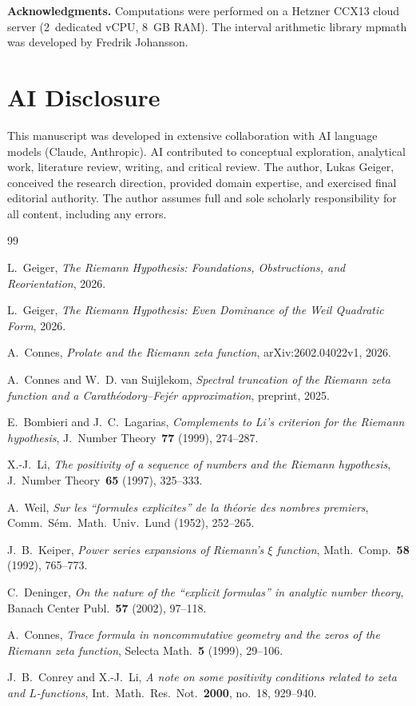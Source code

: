 \documentclass[12pt,a4paper]{article}
\theoremstyle{definition}
\theoremstyle{remark}
\begin{document}
\bigskip
\noindent\textbf{Acknowledgments.} Computations were performed on a Hetzner CCX13 cloud server (2~dedicated vCPU, 8~GB RAM). The interval arithmetic library mpmath was developed by Fredrik Johansson.


\section*{AI Disclosure}

This manuscript was developed in extensive collaboration with AI language models (Claude, Anthropic). AI contributed to conceptual exploration, analytical work, literature review, writing, and critical review. The author, Lukas Geiger, conceived the research direction, provided domain expertise, and exercised final editorial authority. The author assumes full and sole scholarly responsibility for all content, including any errors.


\begin{thebibliography}{99}

L.~Geiger, \emph{The Riemann Hypothesis: Foundations, Obstructions, and Reorientation}, 2026.

L.~Geiger, \emph{The Riemann Hypothesis: Even Dominance of the Weil Quadratic Form}, 2026.

A.~Connes, \emph{Prolate and the Riemann zeta function}, arXiv:2602.04022v1, 2026.

A.~Connes and W.~D. van Suijlekom, \emph{Spectral truncation of the Riemann zeta function and a Carath\'eodory--Fej\'er approximation}, preprint, 2025.

E.~Bombieri and J.~C.~Lagarias, \emph{Complements to Li's criterion for the Riemann hypothesis}, J.~Number Theory~\textbf{77} (1999), 274--287.

X.-J.~Li, \emph{The positivity of a sequence of numbers and the Riemann hypothesis}, J.~Number Theory~\textbf{65} (1997), 325--333.

A.~Weil, \emph{Sur les ``formules explicites'' de la th\'eorie des nombres premiers}, Comm.~S\'em.~Math.~Univ.~Lund (1952), 252--265.

J.~B.~Keiper, \emph{Power series expansions of Riemann's $\xi$ function}, Math.~Comp.~\textbf{58} (1992), 765--773.

C.~Deninger, \emph{On the nature of the ``explicit formulas'' in analytic number theory}, Banach Center Publ.~\textbf{57} (2002), 97--118.

A.~Connes, \emph{Trace formula in noncommutative geometry and the zeros of the Riemann zeta function}, Selecta Math.~\textbf{5} (1999), 29--106.

J.~B.~Conrey and X.-J.~Li, \emph{A note on some positivity conditions related to zeta and $L$-functions}, Int.~Math.~Res.~Not.~\textbf{2000}, no.~18, 929--940.

\end{thebibliography}
\end{document}
